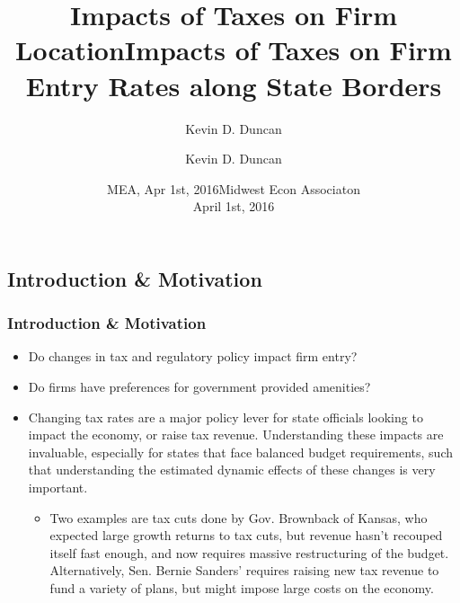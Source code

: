 \documentclass{beamer}
\title{Impacts of Taxes on Firm Location}
\author{Kevin D. Duncan}
\institute{Iowa State University}
\date{MEA, Apr 1st, 2016}
\begin{document}
\begin{frame}
\title{Impacts of Taxes on Firm Entry Rates along State Borders}
\author{Kevin D. Duncan}
\date{Midwest Econ Associaton \\ April 1st, 2016}
\maketitle
\end{frame}

\begin{frame}
\section{Introduction \& Motivation}
\frametitle{Introduction \& Motivation}
\begin{itemize}
\item Do changes in tax and regulatory policy impact firm entry?
\item Do firms have preferences for government provided amenities?
\item Changing tax rates are a major policy lever for state officials looking to impact the economy, or raise tax revenue. Understanding these impacts are invaluable, especially for states that face balanced budget requirements, such that understanding the estimated dynamic effects of these changes is very important.
\begin{itemize}
\item Two examples are tax cuts done by Gov. Brownback of Kansas, who expected large growth returns to tax cuts, but revenue hasn't recouped itself fast enough, and now requires massive restructuring of the budget. Alternatively, Sen. Bernie Sanders' requires raising new tax revenue to fund a variety of plans, but might impose large costs on the economy.
\end{itemize}
\end{itemize}
\end{frame}
\end{document}
